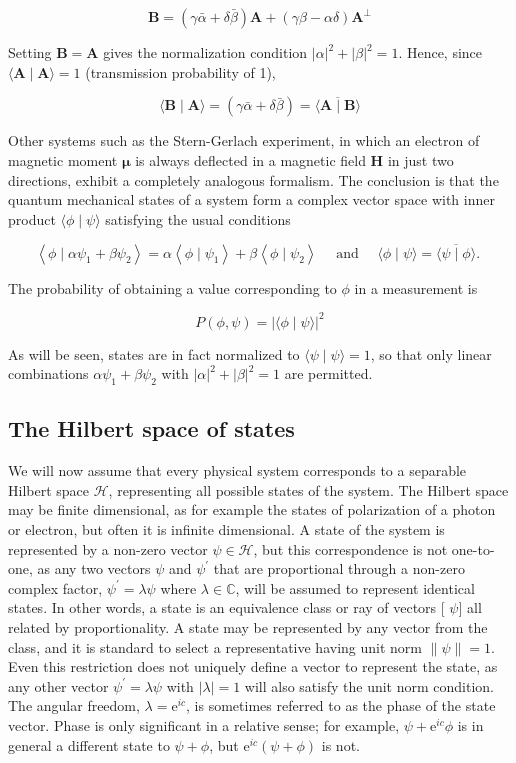 \documentclass[10pt]{article}
\begin{document}
$$
\mathbf{B}=(\gamma \bar{\alpha}+\delta \bar{\beta}) \mathbf{A}+(\gamma \beta-\alpha \delta) \mathbf{A}^{\perp}
$$

Setting $\mathbf{B}=\mathbf{A}$ gives the normalization condition $|\alpha|^{2}+|\beta|^{2}=1$. Hence, since $\langle\mathbf{A} \mid \mathbf{A}\rangle=1$ (transmission probability of 1),

$$
\langle\mathbf{B} \mid \mathbf{A}\rangle=(\gamma \bar{\alpha}+\delta \bar{\beta})=\overline{\langle\mathbf{A} \mid \mathbf{B}\rangle}
$$

Other systems such as the Stern-Gerlach experiment, in which an electron of magnetic moment $\boldsymbol{\mu}$ is always deflected in a magnetic field $\mathbf{H}$ in just two directions, exhibit a completely analogous formalism. The conclusion is that the quantum mechanical states of a system form a complex vector space with inner product $\langle\phi \mid \psi\rangle$ satisfying the usual conditions

$$
\left\langle\phi \mid \alpha \psi_{1}+\beta \psi_{2}\right\rangle=\alpha\left\langle\phi \mid \psi_{1}\right\rangle+\beta\left\langle\phi \mid \psi_{2}\right\rangle \quad \text { and } \quad\langle\phi \mid \psi\rangle=\overline{\langle\psi \mid \phi\rangle} \text {. }
$$

The probability of obtaining a value corresponding to $\phi$ in a measurement is

$$
P(\phi, \psi)=|\langle\phi \mid \psi\rangle|^{2}
$$

As will be seen, states are in fact normalized to $\langle\psi \mid \psi\rangle=1$, so that only linear combinations $\alpha \psi_{1}+\beta \psi_{2}$ with $|\alpha|^{2}+|\beta|^{2}=1$ are permitted.

\subsection{The Hilbert space of states}
We will now assume that every physical system corresponds to a separable Hilbert space $\mathcal{H}$, representing all possible states of the system. The Hilbert space may be finite dimensional, as for example the states of polarization of a photon or electron, but often it is infinite dimensional. A state of the system is represented by a non-zero vector $\psi \in \mathcal{H}$, but this correspondence is not one-to-one, as any two vectors $\psi$ and $\psi^{\prime}$ that are proportional through a non-zero complex factor, $\psi^{\prime}=\lambda \psi$ where $\lambda \in \mathbb{C}$, will be assumed to represent identical states. In other words, a state is an equivalence class or ray of vectors [ $\psi]$ all related by proportionality. A state may be represented by any vector from the class, and it is standard to select a representative having unit norm $\|\psi\|=1$. Even this restriction does not uniquely define a vector to represent the state, as any other vector $\psi^{\prime}=\lambda \psi$ with $|\lambda|=1$ will also satisfy the unit norm condition. The angular freedom, $\lambda=\mathrm{e}^{i c}$, is sometimes referred to as the phase of the state vector. Phase is only significant in a relative sense; for example, $\psi+\mathrm{e}^{i c} \phi$ is in general a different state to $\psi+\phi$, but $\mathrm{e}^{i c}(\psi+\phi)$ is not.
\end{document}
